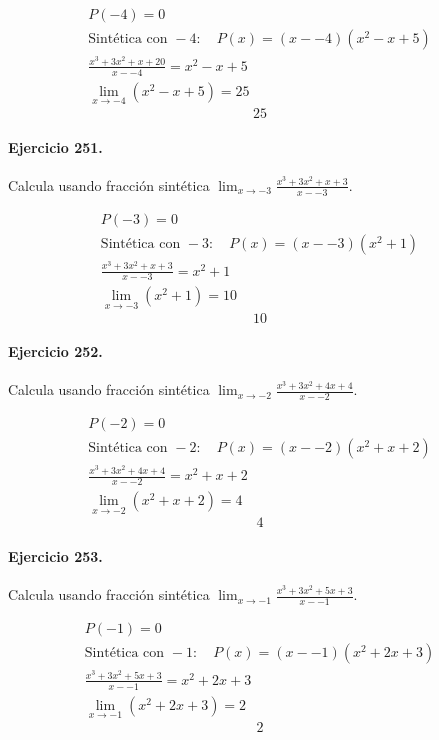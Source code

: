 \documentclass[11pt,a4paper]{article}
\begin{document}
\[
\begin{aligned}
P(-4)=0\\
\text{Sintética con }-4:\quad P(x)=(x--4)(x^2 - x + 5)\\
\frac{x^3 + 3x^2 + x + 20}{x--4}=x^2 - x + 5\\
\lim_{x\to -4}(x^2 - x + 5)=25
\end{aligned}
\]
\[\boxed{25}\]


\paragraph{Ejercicio 251.} Calcula usando fracción sintética $\displaystyle\lim_{x\to -3}\frac{x^3 + 3x^2 + x + 3}{x--3}$. 

\[
\begin{aligned}
P(-3)=0\\
\text{Sintética con }-3:\quad P(x)=(x--3)(x^2 + 1)\\
\frac{x^3 + 3x^2 + x + 3}{x--3}=x^2 + 1\\
\lim_{x\to -3}(x^2 + 1)=10
\end{aligned}
\]
\[\boxed{10}\]


\paragraph{Ejercicio 252.} Calcula usando fracción sintética $\displaystyle\lim_{x\to -2}\frac{x^3 + 3x^2 + 4x + 4}{x--2}$. 

\[
\begin{aligned}
P(-2)=0\\
\text{Sintética con }-2:\quad P(x)=(x--2)(x^2 + x + 2)\\
\frac{x^3 + 3x^2 + 4x + 4}{x--2}=x^2 + x + 2\\
\lim_{x\to -2}(x^2 + x + 2)=4
\end{aligned}
\]
\[\boxed{4}\]


\paragraph{Ejercicio 253.} Calcula usando fracción sintética $\displaystyle\lim_{x\to -1}\frac{x^3 + 3x^2 + 5x + 3}{x--1}$. 

\[
\begin{aligned}
P(-1)=0\\
\text{Sintética con }-1:\quad P(x)=(x--1)(x^2 + 2x + 3)\\
\frac{x^3 + 3x^2 + 5x + 3}{x--1}=x^2 + 2x + 3\\
\lim_{x\to -1}(x^2 + 2x + 3)=2
\end{aligned}
\]
\[\boxed{2}\]
\end{document}
